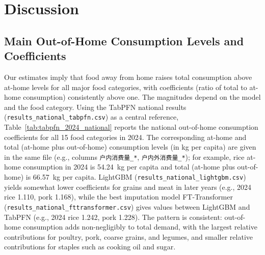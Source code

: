 
\section{Discussion}
\label{sec:discussion}

\subsection{Main Out-of-Home Consumption Levels and Coefficients}

Our estimates imply that food away from home raises total consumption above at-home levels for all major food categories, with coefficients (ratio of total to at-home consumption) consistently above one. The magnitudes depend on the model and the food category. Using the TabPFN national results (\texttt{results\_national\_tabpfn.csv}) as a central reference, Table~\ref{tab:tabpfn_2024_national} reports the national out-of-home consumption coefficients for all 15 food categories in 2024. The corresponding at-home and total (at-home plus out-of-home) consumption levels (in kg per capita) are given in the same file (e.g., columns \texttt{户内消费量\_*}, \texttt{户内外消费量\_*}); for example, rice at-home consumption in 2024 is 54.24~kg per capita and total (at-home plus out-of-home) is 66.57~kg per capita. LightGBM (\texttt{results\_national\_lightgbm.csv}) yields somewhat lower coefficients for grains and meat in later years (e.g., 2024 rice 1.110, pork 1.168), while the best imputation model FT-Transformer (\texttt{results\_national\_fttransformer.csv}) gives values between LightGBM and TabPFN (e.g., 2024 rice 1.242, pork 1.228). The pattern is consistent: out-of-home consumption adds non-negligibly to total demand, with the largest relative contributions for poultry, pork, coarse grains, and legumes, and smaller relative contributions for staples such as cooking oil and sugar.

